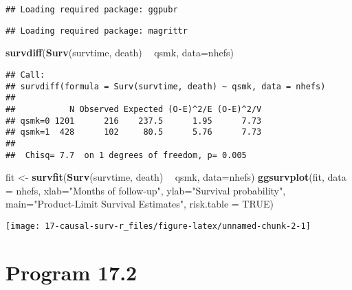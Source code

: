 \documentclass[
  10pt,
]{book}
\newenvironment{Shaded}{\begin{snugshade}}{\end{snugshade}}
\newcommand{\DataTypeTok}[1]{\textcolor[rgb]{0.13,0.29,0.53}{#1}}
\newcommand{\KeywordTok}[1]{\textcolor[rgb]{0.13,0.29,0.53}{\textbf{#1}}}
\newcommand{\NormalTok}[1]{#1}
\newcommand{\OperatorTok}[1]{\textcolor[rgb]{0.81,0.36,0.00}{\textbf{#1}}}
\newcommand{\OtherTok}[1]{\textcolor[rgb]{0.56,0.35,0.01}{#1}}
\newcommand{\StringTok}[1]{\textcolor[rgb]{0.31,0.60,0.02}{#1}}
\begin{document}
\begin{verbatim}
## Loading required package: ggpubr
\end{verbatim}

\begin{verbatim}
## Loading required package: magrittr
\end{verbatim}

\begin{Shaded}
\begin{Highlighting}[]
\KeywordTok{survdiff}\NormalTok{(}\KeywordTok{Surv}\NormalTok{(survtime, death) }\OperatorTok{~}\StringTok{ }\NormalTok{qsmk, }\DataTypeTok{data=}\NormalTok{nhefs)}
\end{Highlighting}
\end{Shaded}

\begin{verbatim}
## Call:
## survdiff(formula = Surv(survtime, death) ~ qsmk, data = nhefs)
## 
##           N Observed Expected (O-E)^2/E (O-E)^2/V
## qsmk=0 1201      216    237.5      1.95      7.73
## qsmk=1  428      102     80.5      5.76      7.73
## 
##  Chisq= 7.7  on 1 degrees of freedom, p= 0.005
\end{verbatim}

\begin{Shaded}
\begin{Highlighting}[]
\NormalTok{fit <-}\StringTok{ }\KeywordTok{survfit}\NormalTok{(}\KeywordTok{Surv}\NormalTok{(survtime, death) }\OperatorTok{~}\StringTok{ }\NormalTok{qsmk, }\DataTypeTok{data=}\NormalTok{nhefs)}
\KeywordTok{ggsurvplot}\NormalTok{(fit, }\DataTypeTok{data =}\NormalTok{ nhefs, }\DataTypeTok{xlab=}\StringTok{"Months of follow-up"}\NormalTok{,}
           \DataTypeTok{ylab=}\StringTok{"Survival probability"}\NormalTok{,}
           \DataTypeTok{main=}\StringTok{"Product-Limit Survival Estimates"}\NormalTok{, }\DataTypeTok{risk.table =} \OtherTok{TRUE}\NormalTok{)}
\end{Highlighting}
\end{Shaded}

\begin{center}\texttt{[image: 17-causal-surv-r\_files/figure-latex/unnamed-chunk-2-1]} \end{center}

\hypertarget{program-17.2}{%
\section{Program 17.2}\label{program-17.2}}
\end{document}
